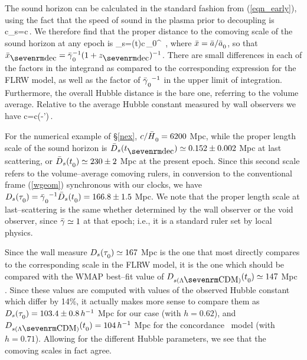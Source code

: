 \documentclass[12pt]{article}
\begin{document}
The sound horizon can be calculated in the standard fashion from
(\ref{eqn_early}), using the fact that the speed of sound in the
plasma prior to decoupling is
\beq
c_s={c\over{}}\,.
\eeq
We therefore find that the proper distance to the comoving scale of the
sound horizon at any epoch is
\beq
\bD_s={\ab(t)\over\ab{}}{c\over{}\,\Hb}\int_0^{\mx{}}
{\dd\mx\over{}}\,,
\eeq
where $\mx=\ab/\ab\Z0$, so that $\mx\ns{dec}=\gc^{-1}(1+z\ns{dec})^{-1}$.
There are small differences in each of the factors in the integrand as
compared to the corresponding expression for the FLRW model, as well as
the factor of ${\gc}^{-1}$ in the upper limit of integration. Furthermore,
the overall Hubble distance is the bare one, referring to the volume average.
Relative to the average Hubble constant measured by wall observers we
have
\beq
{c\over\Hb}={c(\gc-\gc')\over \Hm}\,.
\eeq

For the numerical example of \S\ref{nex}, $c/\Hb=6200$ Mpc, while
the proper length scale of the sound horizon is $\bD_s(t\ns{dec})\simeq
0.152\pm0.002$ Mpc at last scattering, or $\bD_s(t\Z0)\simeq230\pm2$ Mpc at the
present epoch. Since this second scale refers to the volume--average
comoving rulers, in conversion to the conventional frame (\ref{wgeom})
synchronous with our clocks, we have $D_s(\tc\Z0)={\gc}^{-1}\bD_s(t\Z0)
=166.8\pm1.5$ Mpc. We note that the proper length scale at last--scattering
is the same whether determined by the wall observer or the void observer,
since $\gb\simeq1$ at that epoch; i.e., it is a standard ruler set by
local physics.

Since the wall measure $D_s(\tc\Z0)\simeq167$ Mpc is the one that most
directly compares to the corresponding scale in the FLRW model, it is the
one which should be compared with the WMAP best--fit value of
$D\Z{s\lcdm}(t\Z0)\simeq147$ Mpc \cite{wmap}.
Since these values are computed with values of the observed Hubble
constant which differ by 14\%, it actually makes more sense to compare
them as $D_s(\tc\Z0)=103.4\pm0.8\,h^{-1}$ Mpc for our case (with $h=0.62$),
and $D\Z{s\lcdm}(t\Z0)=104\,h^{-1}$ Mpc for the concordance \LCDM\ model
(with $h=0.71$). Allowing for the different Hubble
parameters, we see that the comoving scales in fact agree.
\end{document}
